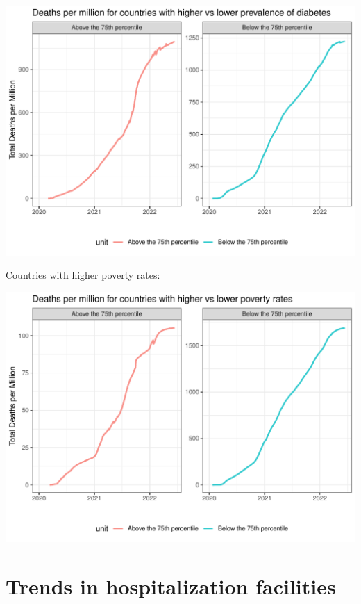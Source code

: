 \documentclass[11pt,preprint, authoryear]{elsarticle}
\let\origfigure\figure
\let\endorigfigure\endfigure
\renewenvironment{figure}[1][2] {
    \expandafter\origfigure\expandafter[H]
} {
    \endorigfigure
}
\numberwithin{equation}{section}
\numberwithin{figure}{section}
\numberwithin{table}{section}
\begin{document}
\begin{figure}[H]

{\centering \includegraphics{Question_1_files/figure-latex/Figure6-1} 

}

\caption{\label{Figure1}}\label{fig:Figure6}
\end{figure}

Countries with higher poverty rates:

\begin{figure}[H]

{\centering \includegraphics{Question_1_files/figure-latex/Figure7-1} 

}

\caption{\label{Figure1}}\label{fig:Figure7}
\end{figure}

\hypertarget{trends-in-hospitalization-facilities}{%
\section{\texorpdfstring{Trends in hospitalization facilities
\label{-}}{Trends in hospitalization facilities }}\label{trends-in-hospitalization-facilities}}


\end{document}

